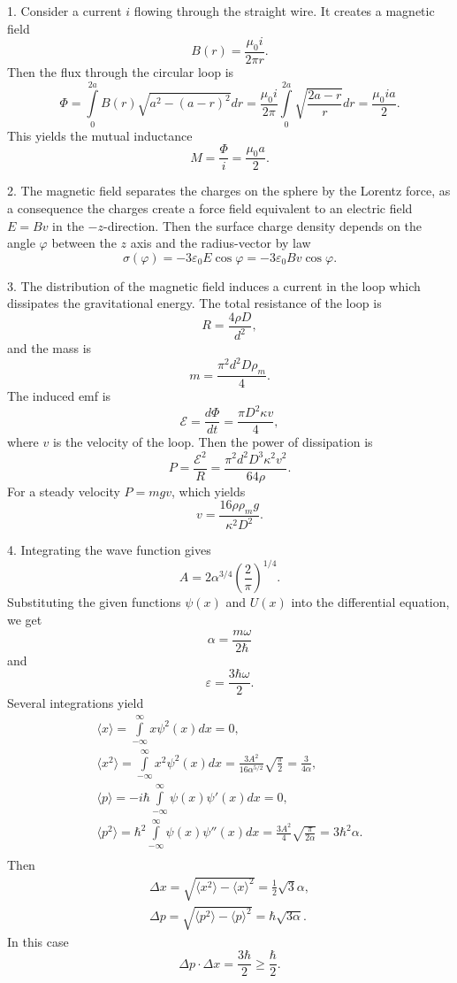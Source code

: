 \documentclass[12pt,a4paper,pdflatex]{disser}
\begin{document}
1. Consider a current $i$ flowing through the straight wire. It creates a magnetic field
$$
  B(r)=\frac{\mu_0 i}{2\pi r}.
$$
Then the flux through the circular loop is
$$
  \Phi=\int\limits_0^{2a} B(r)\sqrt{a^2-(a-r)^2}dr=\frac{\mu_0 i}{2\pi}\int\limits_0^{2a} \sqrt{\frac{2a-r}{r}}dr=\frac{\mu_0 ia}{2}.
$$
This yields the mutual inductance
$$
  M=\frac{\Phi}{i}=\frac{\mu_0 a}{2}.
$$

2. The magnetic field separates the charges on the sphere by the Lorentz force, as a consequence the charges create a force field equivalent to an electric field $E=Bv$ in the $-z$-direction. Then the surface charge density depends on the angle $\varphi$ between the $z$ axis and the radius-vector by law
$$
  \sigma(\varphi)=-3\varepsilon_0 E\cos\varphi=-3\varepsilon_0 Bv\cos\varphi.
$$

3. The distribution of the magnetic field induces a current in the loop which dissipates the gravitational energy. The total resistance of the loop is
$$
  R=\frac{4\rho D}{d^2},
$$
and the mass is
$$
  m=\frac{\pi^2 d^2 D\rho_m}{4}.
$$
The induced emf is
$$
  \mathcal{E}=\frac{d\Phi}{dt}=\frac{\pi D^2 \kappa v}{4},
$$
where $v$ is the velocity of the loop. Then the power of dissipation is
$$
  P=\frac{\mathcal{E}^2}{R}=\frac{\pi^2 d^2 D^3 \kappa^2 v^2}{64\rho}.
$$
For a steady velocity $P=mgv$, which yields
$$
  v=\frac{16\rho \rho_m g}{\kappa^2 D^2}.
$$

4. Integrating the wave function gives
$$
  A=2\alpha^{3/4}\left(\frac{2}{\pi}\right)^{1/4}.
$$
Substituting the given functions $\psi(x)$ and $U(x)$ into the differential equation, we get
$$
  \alpha=\frac{m\omega}{2\hbar}
$$
and
$$
  \varepsilon=\frac{3\hbar\omega}{2}.
$$
Several integrations yield
\begin{gather*}
  \langle x\rangle=\int\limits_{-\infty}^\infty x\psi^2(x)dx=0,\\
  \langle x^2\rangle=\int\limits_{-\infty}^\infty x^2\psi^2(x)dx=\frac{3A^2}{16\alpha^{5/2}}\sqrt{\frac{\pi}{2}}=\frac{3}{4\alpha},\\
  \langle p\rangle=-i\hbar\int\limits_{-\infty}^\infty \psi(x)\psi'(x)dx=0,\\
  \langle p^2\rangle=\hbar^2\int\limits_{-\infty}^\infty \psi(x)\psi''(x)dx=\frac{3A^2}{4}\sqrt{\frac{\pi}{2\alpha}}=3\hbar^2 \alpha.\\
\end{gather*}
Then
\begin{gather*}
  \Delta x=\sqrt{\langle x^2\rangle-\langle x\rangle^2}=\frac{1}{2}\sqrt{3}{\alpha},\\
  \Delta p=\sqrt{\langle p^2\rangle-\langle p\rangle^2}=\hbar\sqrt{3\alpha}.
\end{gather*}
In this case
$$
  \Delta p\cdot\Delta x=\frac{3\hbar}{2}\ge\frac{\hbar}{2}.
$$
\end{document}
